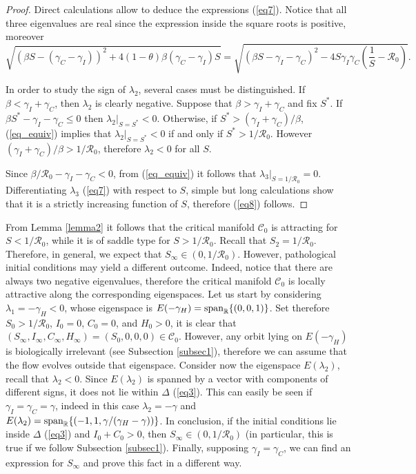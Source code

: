 \documentclass[11pt,reqno]{amsart}
\theoremstyle{boldremark}
\begin{document}
\begin{proof}
    Direct calculations allow to deduce the expressions (\ref{eq7}). Notice that all three eigenvalues are real since the expression inside the square roots is positive, moreover 
    \begin{equation} \label{eq_equiv}
        \sqrt{           
        (\beta S - (\gamma_C - \gamma_I))^2 + 4(1-\theta) \beta (\gamma_C - \gamma_I) S} = \sqrt{(\beta S -\gamma_I - \gamma_C)^2 - 4 S \gamma_I \gamma_C \left(\frac{1}{S}-\mathcal{R}_0\right)}. 
    \end{equation} 

    In order to study the sign of $\lambda_2$, several cases must be distinguished. If $\beta < \gamma_I + \gamma_C$, then $\lambda_2$ is clearly negative. Suppose that $\beta > \gamma_I + \gamma_C$ and fix $S^*$. If $\beta S^* - \gamma_I - \gamma_C \le 0$ then $\lambda_2|_{S=S^*}<0$. Otherwise, if $S^* > (\gamma_I + \gamma_C)/\beta$, (\ref{eq_equiv}) implies that $\lambda_2|_{S=S^*}<0$ if and only if $S^* > 1/\mathcal{R}_0$. However $(\gamma_I + \gamma_C)/\beta > 1/\mathcal{R}_0$, therefore $\lambda_2 < 0$ for all $S$.  
    
    
    Since $\beta/\mathcal{R}_0 - \gamma_I - \gamma_C <0$, from (\ref{eq_equiv}) it follows that $\lambda_3 |_{S=1/\mathcal{R}_0}=0$. Differentiating $\lambda_3$ (\ref{eq7}) with respect to $S$, simple but long calculations show that it is a strictly increasing function of $S$, therefore (\ref{eq8}) follows. 
\end{proof}

From Lemma \ref{lemma2} it follows that the critical manifold $\mathcal{C}_0$ is attracting for $S < 1/\mathcal{R}_0$, while it is of saddle type for $S > 1/\mathcal{R}_0$. Recall that $S_2=1/\mathcal{R}_0$. Therefore, in general, we expect that $S_\infty \in (0, 1/\mathcal{R}_0)$. However, pathological initial conditions may yield a different outcome. Indeed, notice that there are always two negative eigenvalues, therefore the critical manifold $\mathcal{C}_0$ is locally attractive along the corresponding eigenspaces. Let us start by considering $\lambda_1=-\gamma_H<0$, whose eigenspace is $E(-\gamma_H)=\textnormal{span}_\mathbb{R}\{(0,0,1)\}$. Set therefore $S_0>1/\mathcal{R}_0$, $I_0=0$, $C_0=0$, and $H_0>0$, it is clear that $(S_\infty, I_\infty, C_\infty, H_\infty)=(S_0, 0, 0, 0) \in \mathcal{C}_0$. However, any orbit lying on $E(-\gamma_H)$ is biologically irrelevant (see Subsection \ref{subsec1}), therefore we can assume that the flow evolves outside that eigenspace. Consider now the eigenspace $E(\lambda_2)$, recall that $\lambda_2<0$. Since $E(\lambda_2)$ is spanned by a vector with components of different signs, it does not lie within $\Delta$ (\ref{eq3}). This can easily be seen if $\gamma_I=\gamma_C=\gamma$, indeed in this case $\lambda_2=-\gamma$ and $E(\lambda_2)=\textnormal{span}_\mathbb{R}\{(-1,1,\gamma/(\gamma_H-\gamma))\}$. In conclusion, if the initial conditions lie inside $\Delta$ (\ref{eq3}) and $I_0+C_0>0$, then $S_\infty \in (0, 1/\mathcal{R}_0)$ (in particular, this is true if we follow Subsection \ref{subsec1}). Finally, supposing $\gamma_I=\gamma_C$, we can find an expression for $S_\infty$ and prove this fact in a different way. 
\end{document}

